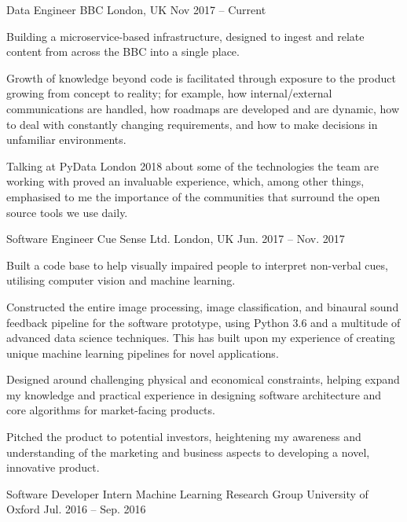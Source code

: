 \begin{cventries}
    \cventry
    {Data Engineer}
    {BBC}
    {London, UK}
    {Nov 2017 – Current}
    {
      \begin{cvitems}
        \item{Building a microservice-based infrastructure, designed to ingest and relate content from across the BBC into a single place.}
        \item{Growth of knowledge beyond code is facilitated through exposure to the product growing from concept to reality; for example, how internal/external communications are handled, how roadmaps are developed and are dynamic, how to deal with constantly changing requirements, and how to make decisions in unfamiliar environments.}
        \item{Talking at PyData London 2018 about some of the technologies the team are working with proved an invaluable experience, which, among other things, emphasised to me the importance of the communities that surround the open source tools we use daily.}
      \end{cvitems}
    }
    \cventry
    {Software Engineer}
    {Cue Sense Ltd.}
    {London, UK}
    {Jun. 2017 – Nov. 2017}
    {
      \begin{cvitems}
        \item {Built a code base to help visually impaired people to interpret non-verbal cues, utilising computer vision and machine learning.}
        \item {Constructed the entire image processing, image classification, and binaural sound feedback pipeline for the software prototype, using Python 3.6 and a multitude of advanced data science techniques. This has built upon my experience of creating unique machine learning pipelines for novel applications.}
        \item {Designed around challenging physical and economical constraints, helping expand my knowledge and practical experience in designing software architecture and core algorithms for market-facing products.}
        \item {Pitched the product to potential investors, heightening my awareness and understanding of the marketing and business aspects to developing a novel, innovative product.}
      \end{cvitems}
    }
    \cventry
    {Software Developer Intern}
    {Machine Learning Research Group}
    {University of Oxford}
    {Jul. 2016 – Sep. 2016}
    {
      \begin{cvitems}

\end{cvitems}}
\end{cventries}
